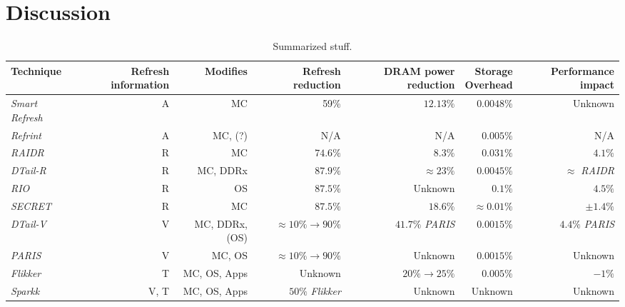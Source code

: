 \section{Discussion} 
\label{sec:disc}

\begin{table*}[t]
	\caption{\label{tbl:summary}Summarized stuff.}
        \begin{center}
			\normalsize
			\begin{tabular}{ l r r r r r r}
				\textbf{Technique} & \parbox{2cm}{ \textbf{Refresh \linebreak information}} & \textbf{Modifies} & \parbox{1.7cm}{ \textbf{Refresh \linebreak reduction}} & \parbox{2.2cm}{ \textbf{DRAM power \linebreak reduction}} & \parbox{1.2cm}{\textbf{Storage \newline Overhead}} & \parbox{1.5cm}{\textbf{Performance impact}} \vspace{0.05cm} \\
				\hline
				\textit{Smart Refresh} & A & MC & 59\% & $12.13\%$ & $0.0048\%$  & Unknown  \\
				\textit{Refrint} & A & MC, (?) & N/A & N/A  & $0.005\%$  & N/A  \\
				\hline
				\textit{RAIDR} & R & MC & $74.6\%$ & $8.3\%$  & $0.031\%$  & $4.1\%$  \\
				\textit{DTail-R} & R & MC, DDRx & $87.9\%$ & $\approx 23\%$  & $0.0045\%$ & $\approx$ \textit{RAIDR} \\
				\textit{RIO} & R & OS & $87.5\%$ & Unknown  & $0.1\%$  & $4.5\%$ \\
				\textit{SECRET} & R & MC & $87.5\%$ & $18.6\%$  & $\approx 0.01\%$  & $\pm 1.4\%$  \\
				\hline
				\textit{DTail-V} & V & MC, DDRx, (OS) & $\approx 10\% \to 90\% $ & $41.7\%$ \textit{PARIS}  & $0.0015\%$ & $4.4\%$ \textit{PARIS}  \\
				\textit{PARIS} & V & MC, OS & $\approx 10\% \to 90\%$ & Unknown  & $0.0015\%$  & Unknown \\
				\hline
				\textit{Flikker} & T & MC, OS, Apps & Unknown & $20\% \to 25\%$  & $0.005\%$  & $-1\%$   \\
				\textit{Sparkk} & V, T  & MC, OS, Apps &  $50\%$ \textit{Flikker} & Unknown & Unknown  & Unknown \\
				\hline
			\end{tabular}
		\end{center}
\end{table*}

